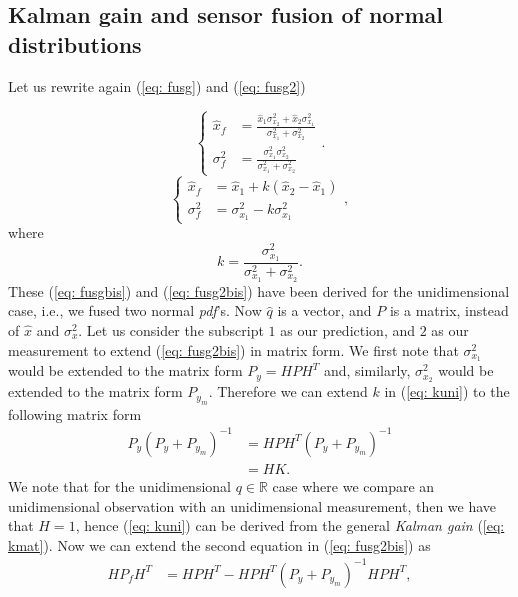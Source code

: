 \documentclass[11pt,a4paper]{article}
\begin{document}
\subsection{Kalman gain and sensor fusion of normal distributions}
Let us rewrite again (\ref{eq: fusg}) and (\ref{eq: fusg2})

\begin{equation}
	\begin{cases}
		\hat x_f &= \frac{\hat x_1\sigma_{x_2}^2 + \hat x_2\sigma_{x_1}^2 }{\sigma_{x_1}^2 + \sigma_{x_2}^2} \\
		\sigma_f^2 &= \frac{\sigma_{x_1}^2 \sigma_{x_2}^2}{\sigma_{x_1}^2 + \sigma_{x_2}^2}
	\end{cases}.
	\label{eq: fusgbis}
\end{equation}
\begin{equation}
	\begin{cases}
		\hat x_f &= \hat x_1 + k(\hat x_2 - \hat x_1) \\
		\sigma_f^2 &= \sigma_{x_1}^2 - k\sigma_{x_1}^2
	\end{cases},
	\label{eq: fusg2bis}
\end{equation}
where 
\begin{equation}
k = \frac{\sigma_{x_1}^2}{\sigma_{x_1}^2 + \sigma_{x_2}^2}.
	\label{eq: kuni}
\end{equation}
These (\ref{eq: fusgbis}) and (\ref{eq: fusg2bis}) have been derived for the unidimensional case, i.e., we fused two normal \emph{pdf}'s. Now $\hat q$ is a vector, and $P$ is a matrix, instead of $\hat x$ and $\sigma_x^2$. Let us consider the subscript $1$ as our prediction, and $2$ as our measurement to extend (\ref{eq: fusg2bis}) in matrix form. We first note that $\sigma_{x_1}^2$ would be extended to the matrix form $P_y = HPH^T$ and, similarly, $\sigma_{x_2}^2$ would be extended to the matrix form $P_{y_m}$. Therefore we can extend $k$ in (\ref{eq: kuni}) to the following matrix form
\begin{align}
	P_y (P_y + P_{y_m})^{-1} &= HPH^T (P_y + P_{y_m})^{-1} \nonumber \\
	&= HK. \label{eq: kmat}
\end{align}
We note that for the unidimensional $q\in\mathbb{R}$ case where we compare an unidimensional observation with an unidimensional measurement, then we have that $H=1$, hence (\ref{eq: kuni}) can be derived from the general \emph{Kalman gain} (\ref{eq: kmat}). Now we can extend the second equation in (\ref{eq: fusg2bis}) as
\begin{align}
	HP_fH^T &= HPH^T -  HPH^T (P_y + P_{y_m})^{-1} HPH^T,
	\label{eq: e}
\end{align}
\end{document}
